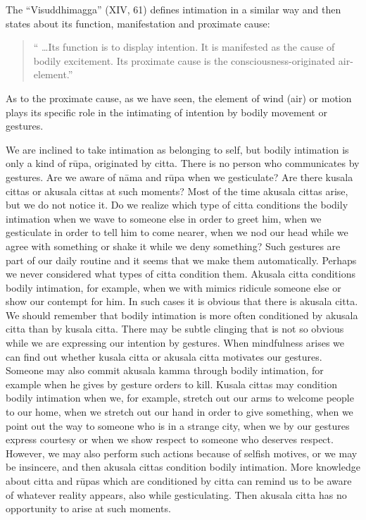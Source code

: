 \documentclass{book}
\begin{document}
The ``Visuddhimagga'' (XIV, 61) defines intimation in a similar way and
then states about its function, manifestation and proximate cause:




\begin{quote}\begin{flushleft}
`` \ldots Its function is to display intention. It is manifested as the
cause of bodily excitement. Its proximate cause is the
consciousness-originated air- element.''
\end{flushleft}\end{quote}




As to the proximate cause, as we have seen, the element of wind (air) or
motion plays its specific role in the intimating of intention by bodily
movement or gestures. 

We are inclined to take intimation as belonging to self, but bodily
intimation is only a kind of r\=upa, originated by citta. There is no
person who communicates by gestures. Are we aware of n{\=a}ma and
r\=upa when we gesticulate? Are there kusala cittas or akusala cittas
at such moments? Most of the time akusala cittas arise, but we do not
notice it. Do we realize which type of citta conditions the bodily
intimation when we wave to someone else in order to greet him, when we
gesticulate in order to tell him to come nearer, when we nod our head
while we agree with something or shake it while we deny something? Such
gestures are part of our daily routine and it seems that we make them
automatically. Perhaps we never considered what types of citta
condition them. Akusala citta conditions bodily intimation, for
example, when we with mimics ridicule someone else or show our contempt
for him. In such cases it is obvious that there is akusala citta. We
should remember that bodily intimation is more often conditioned by
akusala citta than by kusala citta. There may be subtle clinging that
is not so obvious while we are expressing our intention by gestures.
When mindfulness arises we can find out whether kusala citta or akusala
citta motivates our gestures. Someone may also commit akusala kamma
through bodily intimation, for example when he gives by
gesture orders to kill. Kusala cittas may condition bodily
intimation when we, for example, stretch out our arms to welcome people
to our home, when we stretch out our hand in order to give something,
when we point out the way to someone who is in a strange city, when we
by our gestures express courtesy or when we show respect to someone who
deserves respect. However, we may also perform such actions because of
selfish motives, or we may be insincere, and then akusala cittas
condition bodily intimation. More knowledge about citta and r\=upas
which are conditioned by citta can remind us to be aware of whatever
reality appears, also while gesticulating. Then akusala citta has no
opportunity to arise at such moments. 
\end{document}
